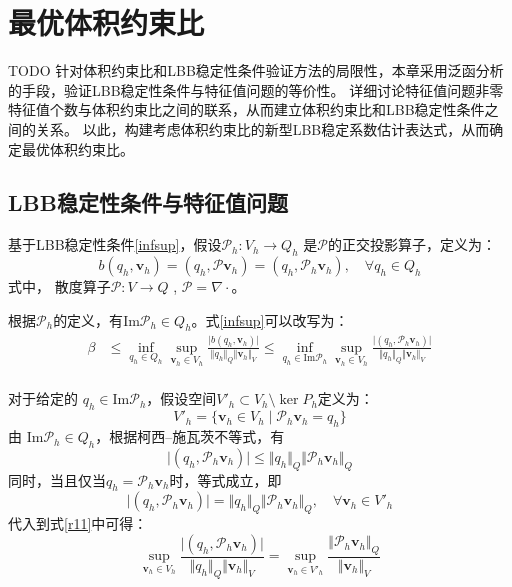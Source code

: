 \chapter{最优体积约束比}
TODO
针对体积约束比和LBB稳定性条件验证方法的局限性，本章采用泛函分析的手段，验证LBB稳定性条件与特征值问题的等价性。
详细讨论特征值问题非零特征值个数与体积约束比之间的联系，从而建立体积约束比和LBB稳定性条件之间的关系。
以此，构建考虑体积约束比的新型LBB稳定系数估计表达式，从而确定最优体积约束比。

\section{LBB稳定性条件与特征值问题}

基于LBB稳定性条件\eqref{infsup}，假设$\mathcal P_h:V_h \rightarrow Q_h$ 是$\mathcal P$的正交投影算子，定义为：
\begin{equation}\label{Ph}
    b(q_h,\boldsymbol v_h) = (q_h, \mathcal P \boldsymbol v_h) = (q_h, \mathcal P_h \boldsymbol v_h), \quad \forall q_h \in Q_h
\end{equation}
式中， 散度算子$\mathcal P:V\rightarrow Q$ , $\mathcal P = \nabla \cdot$。

根据$\mathcal P_h$的定义，有$\mathrm{Im}\mathcal P_h \in Q_h$。式\eqref{infsup}可以改写为：
\begin{equation} \label{r11}
    \begin{split}
        \beta &\le \inf_{q_h \in Q_h} \sup_{\boldsymbol v_h \in V_h} \frac{\vert b(q_h,\boldsymbol v_h) \vert}{\Vert q_h \Vert_Q \Vert \boldsymbol v_h \Vert_V} 
        \le \inf_{q_h \in \mathrm{Im}\mathcal P_h} \sup_{\boldsymbol v_h \in V_h} \frac{\vert (q_h,\mathcal P_h \boldsymbol v_h) \vert}{\Vert q_h \Vert_Q \Vert \boldsymbol v_h \Vert_V} \\
    \end{split}
\end{equation}

对于给定的 $q_h\in \mathrm{Im}\mathcal P_h$，假设空间$V'_h \subset V_h\setminus \ker P_h$定义为：
\begin{equation}
    V'_h = \{ \boldsymbol v_h \in V_h \; \vert \; \mathcal P_h \boldsymbol v_h = q_h \}
\end{equation}
由 $\mathrm{Im}\mathcal P_h \in Q_h$，根据柯西--施瓦茨不等式，有
\begin{equation}
    \vert (q_h,\mathcal P_h \boldsymbol v_h) \vert \le \Vert q_h \Vert_Q \Vert \mathcal P_h \boldsymbol v_h \Vert_Q
\end{equation}
同时，当且仅当$q_h=\mathcal P_h \boldsymbol v_h$时，等式成立，即
\begin{equation}
    \vert (q_h,\mathcal P_h \boldsymbol v_h) \vert = \Vert q_h \Vert_Q \Vert \mathcal P_h \boldsymbol v_h \Vert_Q, \quad \forall \boldsymbol v_h \in V'_h
\end{equation}
代入到式\eqref{r11}中可得：
\begin{equation}\label{r12}
    \sup_{\boldsymbol v_h\in V_h} \frac{\vert (q_h,\mathcal P_h \boldsymbol v_h) \vert}{\Vert q_h \Vert_Q \Vert \boldsymbol v_h \Vert_V} =
    \sup_{\boldsymbol v_h\in V'_h} \frac{\Vert \mathcal P_h \boldsymbol v_h \Vert_Q}{\Vert \boldsymbol v_h \Vert_V} 
\end{equation}

